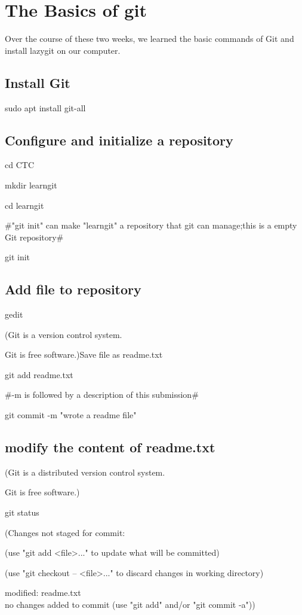 \section{The Basics of git}
Over the course of these two weeks, we learned the basic commands of Git and install lazygit on our computer.
\subsection{Install Git}
    sudo apt install git-all\\
\subsection{Configure and initialize a repository}
    cd CTC
    
    mkdir learngit
    
    cd learngit
    
    #"git init" can make "learngit" a repository that git can manage;this is a empty Git repository#
   
    git init 
\subsection{Add file to repository}
    gedit
    
    (Git is a version control system.
    
    Git is free software.)Save file as readme.txt
    
    git add readme.txt
    
    #-m is followed by a description of this submission#
    
    git commit -m "wrote a readme file"
\subsection{modify the content of readme.txt }
    (Git is a distributed version control system.
    
    Git is free software.)
    
    git status 
    
    (Changes not staged for commit:
    
    (use "git add <file>..." to update what will be committed)
    
    (use "git checkout -- <file>..." to discard changes in working directory)

	modified:   readme.txt\\

    no changes added to commit (use "git add" and/or "git commit -a"))
    
